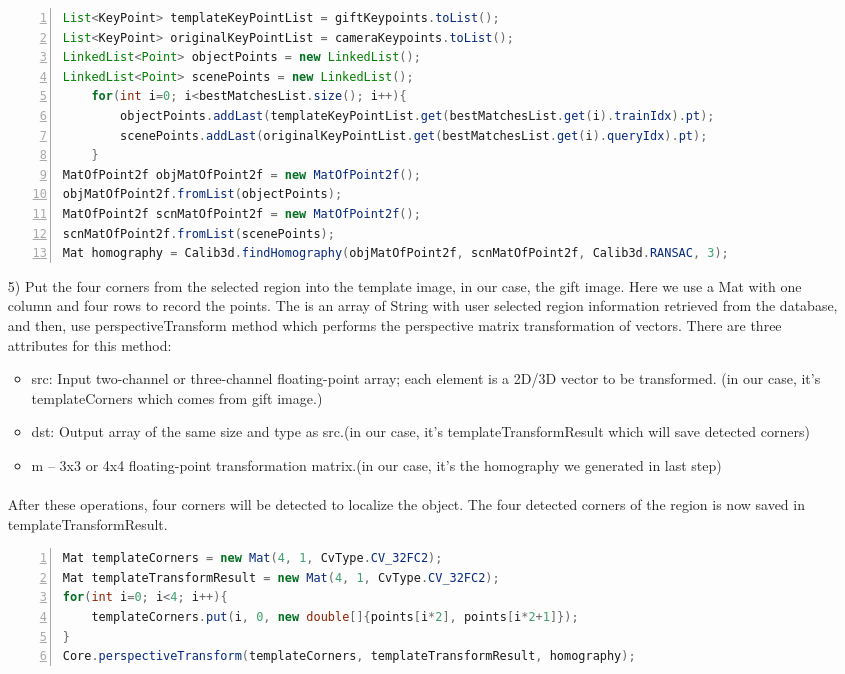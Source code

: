 \begin{enumerate}
\begin{lstlisting}[caption={Get Keypoints From \bsq{Good} Matches},language={java},
        numbers=left,basicstyle=\footnotesize\ttfamily,breaklines=true,xleftmargin=.05\textwidth, xrightmargin=.05\textwidth] 
List<KeyPoint> templateKeyPointList = giftKeypoints.toList();
List<KeyPoint> originalKeyPointList = cameraKeypoints.toList();
LinkedList<Point> objectPoints = new LinkedList();
LinkedList<Point> scenePoints = new LinkedList();
    for(int i=0; i<bestMatchesList.size(); i++){
        objectPoints.addLast(templateKeyPointList.get(bestMatchesList.get(i).trainIdx).pt);
        scenePoints.addLast(originalKeyPointList.get(bestMatchesList.get(i).queryIdx).pt);
    }
MatOfPoint2f objMatOfPoint2f = new MatOfPoint2f();
objMatOfPoint2f.fromList(objectPoints);
MatOfPoint2f scnMatOfPoint2f = new MatOfPoint2f();
scnMatOfPoint2f.fromList(scenePoints);
Mat homography = Calib3d.findHomography(objMatOfPoint2f, scnMatOfPoint2f, Calib3d.RANSAC, 3);
\end{lstlisting} 
\item[5)] Put the four corners from the selected region into the template image, in our case, the gift image. Here we use a {\ttfamily Mat} with one column and four rows to record the points. The  is an array of String with user selected region information retrieved from the database, and then, use perspectiveTransform method which performs the perspective matrix transformation of vectors. There are three attributes for this method: 
\begin{itemize}
\item src: Input two-channel or three-channel floating-point array; each element is a 2D/3D vector to be transformed. (in our case, it's templateCorners which comes from gift image.)
\item dst: Output array of the same size and type as src.(in our case, it's templateTransformResult which will save detected corners)
\item m – 3x3 or 4x4 floating-point transformation matrix.(in our case, it's the homography we generated in last step)
\end{itemize}
\paragraph{} After these operations, four corners will be detected to localize the object. The four detected corners of the region is now saved in templateTransformResult.
\begin{lstlisting}[caption={Localize the Object},language={java},
        numbers=left,basicstyle=\footnotesize\ttfamily,breaklines=true,xleftmargin=.05\textwidth, xrightmargin=.05\textwidth]
Mat templateCorners = new Mat(4, 1, CvType.CV_32FC2);
Mat templateTransformResult = new Mat(4, 1, CvType.CV_32FC2);
for(int i=0; i<4; i++){
    templateCorners.put(i, 0, new double[]{points[i*2], points[i*2+1]});
}
Core.perspectiveTransform(templateCorners, templateTransformResult, homography);
\end{lstlisting} 
\end{enumerate}
